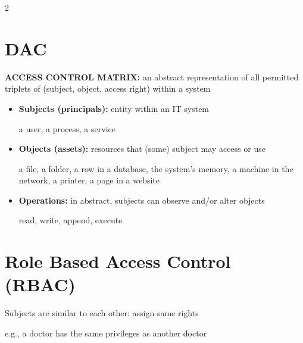 \documentclass[a4paper,9pt]{extarticle}
\begin{document}
\begin{multicols}{2}
\section{DAC}


\begin{definition}

\textbf{ACCESS CONTROL MATRIX:} an abstract representation of all permitted triplets
of (subject, object, access right) within a system

\end{definition}


\begin{itemize}

\item \textbf{Subjects (principals):} entity within an IT system

a user, a process, a service

\item \textbf{Objects (assets):} resources that (some) subject may access or use

a file, a folder, a row in a database, the system's memory, a machine in the network,
a printer, a page in a website

\item \textbf{Operations:} in abstract, subjects can observe and/or alter objects

read, write, append, execute

\end{itemize}



\section{Role Based Access Control (RBAC)}


\begin{important}

Subjects are similar to each other: assign same rights

\end{important}


\begin{example}

e.g., a doctor has the same privileges as another doctor

\end{example}


\begin{enumerate}[leftmargin=*, itemsep=1pt, topsep=1pt]


\end{enumerate}
\end{multicols}
\end{document}
